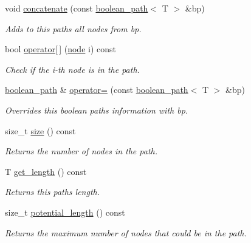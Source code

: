 \begin{DoxyCompactItemize}
void \hyperlink{classlgraph_1_1utils_1_1boolean__path_a005364eb88d63910a6e3965548d49197}{concatenate} (const \hyperlink{classlgraph_1_1utils_1_1boolean__path}{boolean\+\_\+path}$<$ T $>$ \&bp)
\begin{DoxyCompactList}\small\item\em Adds to this paths all nodes from bp. \end{DoxyCompactList}\item 
bool \hyperlink{classlgraph_1_1utils_1_1boolean__path_a9f0255a332cef8af3193fd683839d870}{operator\mbox{[}$\,$\mbox{]}} (\hyperlink{namespacelgraph_1_1utils_a7bd66ede3805ef121bc2835bd48de0cf}{node} i) const 
\begin{DoxyCompactList}\small\item\em Check if the i-\/th node is in the path. \end{DoxyCompactList}\item 
\hyperlink{classlgraph_1_1utils_1_1boolean__path}{boolean\+\_\+path} \& \hyperlink{classlgraph_1_1utils_1_1boolean__path_aedf4e03dbf45c2f66c79d01de5977ede}{operator=} (const \hyperlink{classlgraph_1_1utils_1_1boolean__path}{boolean\+\_\+path}$<$ T $>$ \&bp)
\begin{DoxyCompactList}\small\item\em Overrides this boolean path\textquotesingle{}s information with {\itshape bp}. \end{DoxyCompactList}\item 
size\+\_\+t \hyperlink{classlgraph_1_1utils_1_1boolean__path_a783ac5583112896796549774fd9e66c2}{size} () const 
\begin{DoxyCompactList}\small\item\em Returns the number of nodes in the path. \end{DoxyCompactList}\item 
T \hyperlink{classlgraph_1_1utils_1_1boolean__path_a2707b0a596ca58e412b41e70d07ae055}{get\+\_\+length} () const 
\begin{DoxyCompactList}\small\item\em Returns this path\textquotesingle{}s length. \end{DoxyCompactList}\item 
size\+\_\+t \hyperlink{classlgraph_1_1utils_1_1boolean__path_a572b365b3ab1232ca5d6f2fce4cd4519}{potential\+\_\+length} () const 
\begin{DoxyCompactList}\small\item\em Returns the maximum number of nodes that could be in the path. \end{DoxyCompactList}\item 

\end{DoxyCompactItemize}
